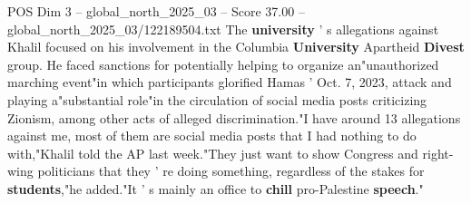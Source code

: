 \begin{textsample}{POS Dim 3 – global\_north\_2025\_03 – Score 37.00 – global\_north\_2025\_03/122189504.txt}
The \textbf{university} ' s allegations against Khalil focused on his involvement in the Columbia \textbf{University} Apartheid \textbf{Divest} group.
He faced sanctions for potentially helping to organize an"unauthorized marching event"in which participants glorified Hamas ' Oct. 7, 2023, attack and playing a"substantial role"in the circulation of social media posts criticizing Zionism, among other acts of alleged discrimination."I have around 13 allegations against me, most of them are social media posts that I had nothing to do with,"Khalil told the AP last week."They just want to show Congress and right-wing politicians that they ' re doing something, regardless of the stakes for \textbf{students},"he added."It ' s mainly an office to \textbf{chill} pro-Palestine \textbf{speech}."

\end{textsample}
